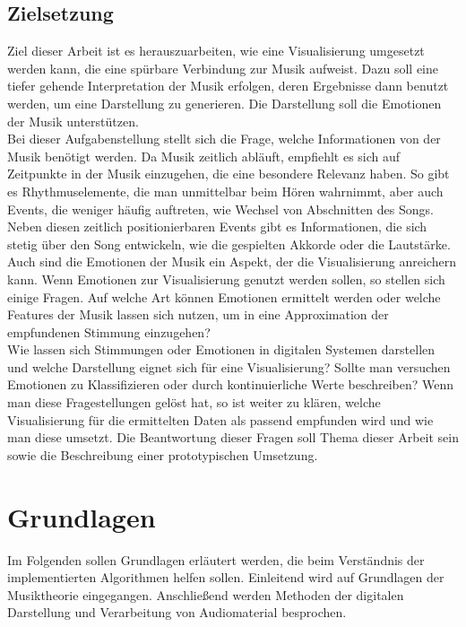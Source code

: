 \documentclass[11pt,a4paper]{article}
\begin{document}
\subsection{Zielsetzung}
Ziel dieser Arbeit ist es herauszuarbeiten, wie eine Visualisierung umgesetzt werden kann, die eine spürbare Verbindung zur Musik aufweist. Dazu soll eine tiefer gehende Interpretation der Musik erfolgen, deren Ergebnisse dann benutzt werden, um eine Darstellung zu generieren. Die Darstellung soll die Emotionen der Musik unterstützen.\\
Bei dieser Aufgabenstellung stellt sich die Frage, welche Informationen von der Musik benötigt werden. Da Musik zeitlich abläuft, empfiehlt es sich auf Zeitpunkte in der Musik einzugehen, die eine besondere Relevanz haben. So gibt es Rhythmuselemente, die man unmittelbar beim Hören wahrnimmt, aber auch Events, die weniger häufig auftreten, wie Wechsel von Abschnitten des Songs. Neben diesen zeitlich positionierbaren Events gibt es Informationen, die sich stetig über den Song entwickeln, wie die gespielten Akkorde oder die Lautstärke.\\
Auch sind die Emotionen der Musik ein Aspekt, der die Visualisierung anreichern kann.
Wenn Emotionen zur Visualisierung genutzt werden sollen, so stellen sich einige Fragen. Auf welche Art können Emotionen ermittelt werden oder welche Features der Musik lassen sich nutzen, um in eine Approximation der empfundenen Stimmung einzugehen?\\
Wie lassen sich Stimmungen oder Emotionen in digitalen Systemen darstellen und welche Darstellung eignet sich für eine Visualisierung? Sollte man versuchen Emotionen zu Klassifizieren oder durch kontinuierliche Werte beschreiben?
Wenn man diese Fragestellungen gelöst hat, so ist weiter zu klären, welche Visualisierung für die ermittelten Daten als passend empfunden wird und wie man diese umsetzt.
Die Beantwortung dieser Fragen soll Thema dieser Arbeit sein sowie die Beschreibung einer prototypischen Umsetzung.

\newpage
\section{Grundlagen}
Im Folgenden sollen Grundlagen erläutert werden, die beim Verständnis der implementierten Algorithmen helfen sollen. Einleitend wird auf Grundlagen der Musiktheorie eingegangen. Anschließend werden Methoden der digitalen Darstellung und Verarbeitung von Audiomaterial besprochen.
\end{document}

